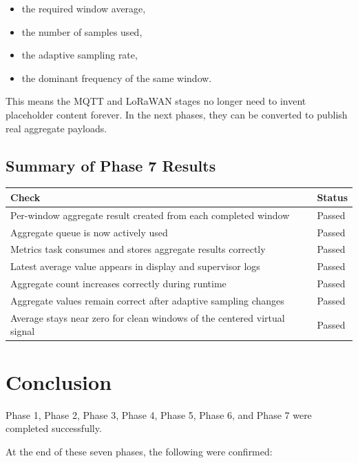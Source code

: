\documentclass[12pt,a4paper]{article}
\begin{document}
\begin{itemize}
    \item the required window average,
    \item the number of samples used,
    \item the adaptive sampling rate,
    \item the dominant frequency of the same window.
\end{itemize}

This means the MQTT and LoRaWAN stages no longer need to invent placeholder
content forever. In the next phases, they can be converted to publish real
aggregate payloads.

\subsection{Summary of Phase 7 Results}

\begin{longtable}{|>{\raggedright\arraybackslash}p{}|>{\raggedright\arraybackslash}p{}|}
\hline
\textbf{Check} & \textbf{Status} \\
\hline
Per-window aggregate result created from each completed window & Passed \\
\hline
Aggregate queue is now actively used & Passed \\
\hline
Metrics task consumes and stores aggregate results correctly & Passed \\
\hline
Latest average value appears in display and supervisor logs & Passed \\
\hline
Aggregate count increases correctly during runtime & Passed \\
\hline
Aggregate values remain correct after adaptive sampling changes & Passed \\
\hline
Average stays near zero for clean windows of the centered virtual signal & Passed \\
\hline
\end{longtable}

\section{Conclusion}

Phase 1, Phase 2, Phase 3, Phase 4, Phase 5, Phase 6, and Phase 7 were completed
successfully.

At the end of these seven phases, the following were confirmed:
\end{document}
